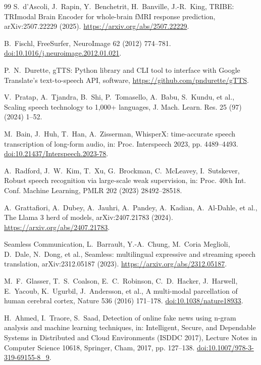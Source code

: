 \documentclass[preprint,12pt]{elsarticle}
\begin{document}
\begin{thebibliography}{99}
S.~d'Ascoli, J.~Rapin, Y.~Benchetrit, H.~Banville, J.-R.~King,
TRIBE: TRImodal Brain Encoder for whole-brain fMRI response prediction,
arXiv:2507.22229 (2025). \url{https://arxiv.org/abs/2507.22229}.

B.~Fischl,
FreeSurfer,
NeuroImage 62 (2012) 774--781.
\href{https://doi.org/10.1016/j.neuroimage.2012.01.021}{doi:10.1016/j.neuroimage.2012.01.021}.

P.~N.~Durette,
gTTS: Python library and CLI tool to interface with Google Translate's text-to-speech API,
software, \url{https://github.com/pndurette/gTTS}.

V.~Pratap, A.~Tjandra, B.~Shi, P.~Tomasello, A.~Babu, S.~Kundu, et al.,
Scaling speech technology to 1,000+ languages,
J. Mach. Learn. Res. 25 (97) (2024) 1--52.

M.~Bain, J.~Huh, T.~Han, A.~Zisserman,
WhisperX: time-accurate speech transcription of long-form audio,
in: Proc. Interspeech 2023, pp. 4489--4493.
\href{https://doi.org/10.21437/Interspeech.2023-78}{doi:10.21437/Interspeech.2023-78}.

A.~Radford, J.~W.~Kim, T.~Xu, G.~Brockman, C.~McLeavey, I.~Sutskever,
Robust speech recognition via large-scale weak supervision,
in: Proc. 40th Int. Conf. Machine Learning, PMLR 202 (2023) 28492--28518.

A.~Grattafiori, A.~Dubey, A.~Jauhri, A.~Pandey, A.~Kadian, A.~Al-Dahle, et al.,
The Llama 3 herd of models,
arXiv:2407.21783 (2024). \url{https://arxiv.org/abs/2407.21783}.

Seamless Communication, L.~Barrault, Y.-A.~Chung, M.~Coria Meglioli, D.~Dale, N.~Dong,
et al.,
Seamless: multilingual expressive and streaming speech translation,
arXiv:2312.05187 (2023). \url{https://arxiv.org/abs/2312.05187}.

M.~F.~Glasser, T.~S.~Coalson, E.~C.~Robinson, C.~D.~Hacker, J.~Harwell, E.~Yacoub,
K.~Ugurbil, J.~Andersson, et al.,
A multi-modal parcellation of human cerebral cortex,
Nature 536 (2016) 171--178.
\href{https://doi.org/10.1038/nature18933}{doi:10.1038/nature18933}.

H.~Ahmed, I.~Traore, S.~Saad,
Detection of online fake news using n-gram analysis and machine learning techniques,
in: Intelligent, Secure, and Dependable Systems in Distributed and Cloud Environments
(ISDDC 2017), Lecture Notes in Computer Science 10618, Springer, Cham, 2017, pp. 127--138.
\href{https://doi.org/10.1007/978-3-319-69155-8_9}{doi:10.1007/978-3-319-69155-8\_9}.


\end{thebibliography}
\end{document}

